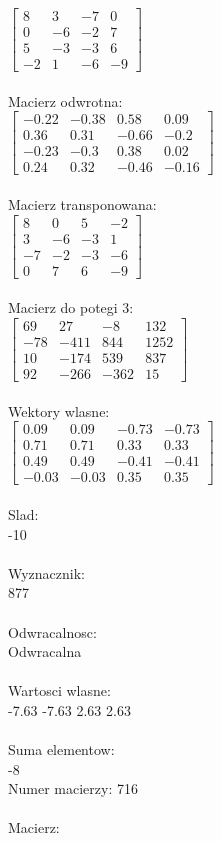 \documentclass[a4paper,12pt]{article}
\begin{document}
$\begin{bmatrix} 8&3&-7&0\\0&-6&-2&7\\5&-3&-3&6\\-2&1&-6&-9 \end{bmatrix}$
\\
\\
Macierz odwrotna:\\

$\begin{bmatrix} -0.22&-0.38&0.58&0.09\\0.36&0.31&-0.66&-0.2\\-0.23&-0.3&0.38&0.02\\0.24&0.32&-0.46&-0.16 \end{bmatrix}$
\\
\\
Macierz transponowana:\\

$\begin{bmatrix} 8&0&5&-2\\3&-6&-3&1\\-7&-2&-3&-6\\0&7&6&-9 \end{bmatrix}$
\\
\\
Macierz do potegi 3:\\

$\begin{bmatrix} 69&27&-8&132\\-78&-411&844&1252\\10&-174&539&837\\92&-266&-362&15 \end{bmatrix}$
\\
\\
Wektory wlasne:\\

$\begin{bmatrix} 0.09&0.09&-0.73&-0.73\\0.71&0.71&0.33&0.33\\0.49&0.49&-0.41&-0.41\\-0.03&-0.03&0.35&0.35 \end{bmatrix}$
\\
\\
Slad:\\
-10
\\
\\
Wyznacznik:\\
877
\\
\\
Odwracalnosc:\\
Odwracalna
\\
\\
Wartosci wlasne:\\
-7.63 -7.63 2.63 2.63
\\
\\
Suma elementow:\\
-8
\\
\newpage
Numer macierzy:
716
\\
\\
Macierz:\\
\end{document}
